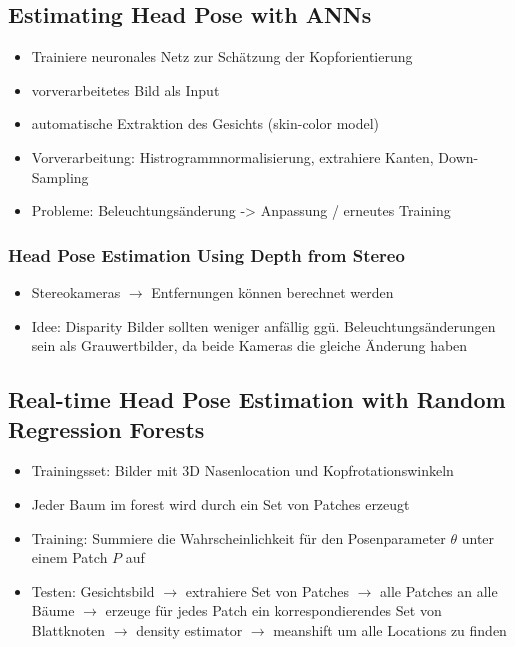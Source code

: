 \documentclass[paper=a4, fontsize=11pt]{scrartcl} %
\numberwithin{equation}{section} %
\numberwithin{figure}{section} %
\numberwithin{table}{section} %
\begin{document}
\subsection{Estimating Head Pose with ANNs}

\begin{itemize}
\item Trainiere neuronales Netz zur Schätzung der Kopforientierung
\item vorverarbeitetes Bild als Input
\item automatische Extraktion des Gesichts (skin-color model)
\item Vorverarbeitung: Histrogrammnormalisierung, extrahiere Kanten, Down-Sampling
\item Probleme: Beleuchtungsänderung -> Anpassung / erneutes Training
\end{itemize}

\subsubsection{Head Pose Estimation Using Depth from Stereo}

\begin{itemize}
\item Stereokameras $\rightarrow$ Entfernungen können berechnet werden
\item Idee: Disparity Bilder sollten weniger anfällig ggü. Beleuchtungsänderungen sein als Grauwertbilder, da beide Kameras die gleiche Änderung haben
\end{itemize}

\subsection{Real-time Head Pose Estimation with Random Regression Forests}

\begin{itemize}
\item Trainingsset: Bilder mit 3D Nasenlocation und Kopfrotationswinkeln
\item Jeder Baum im forest wird durch ein Set von Patches erzeugt
\item Training: Summiere die Wahrscheinlichkeit für den Posenparameter $\theta$ unter einem Patch $P$ auf
\item Testen: Gesichtsbild $\rightarrow$ extrahiere Set von Patches $\rightarrow$ alle Patches an alle Bäume $\rightarrow$ erzeuge für jedes Patch ein korrespondierendes Set von Blattknoten $\rightarrow$ density estimator $\rightarrow$ meanshift um alle Locations zu finden
\end{itemize}
\end{document}
